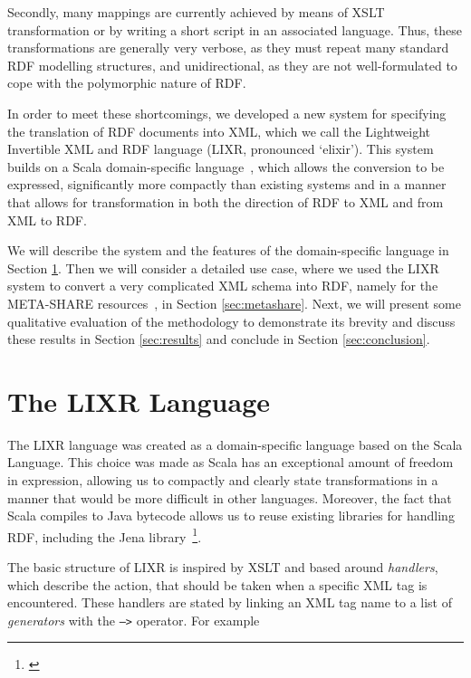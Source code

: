 \documentclass{acm_proc_article-sp}
\begin{document}
Secondly, many mappings are currently achieved by means of XSLT transformation or 
by writing a short script in an associated language. Thus, these transformations
are generally very verbose, as they must repeat many standard RDF modelling
structures, and unidirectional, as they are not well-formulated to cope with the 
polymorphic nature of RDF.

In order to meet these shortcomings, we developed a new system for specifying the
translation of RDF documents into XML, which we call the Lightweight Invertible
XML and RDF language (LIXR, pronounced `elixir'). This system builds on a 
Scala domain-specific language~\cite[DSL]{fowler2010domain,wampler2008programming}, which allows the conversion to be
expressed, significantly more compactly than existing systems and in a manner
that allows for transformation in both the direction of RDF to XML and from XML
to RDF.

We will describe the system and the features of the domain-specific language in Section
\ref{sec:dsl}. Then we will consider a detailed use case, where we used the LIXR
system to convert a very complicated XML schema into RDF, namely for the META-SHARE
resources~\cite{mccrae2015ontology,piperidis2012meta}, in Section \ref{sec:metashare}. Next, we will present some qualitative evaluation
of the methodology to demonstrate its brevity and discuss these results in Section
\ref{sec:results} and conclude in Section \ref{sec:conclusion}.

\section{The LIXR Language}
\label{sec:dsl}

The LIXR language was created as a domain-specific language based on the Scala
Language. This choice was made as Scala has an exceptional amount of freedom in
expression, allowing us to compactly and clearly state transformations in a manner
that would be more difficult in other languages. Moreover, the fact that Scala
compiles to Java bytecode allows us to reuse existing libraries for handling
RDF, including the Jena library~\footnote{\url{}}.

The basic structure of LIXR is inspired by XSLT and based around \emph{handlers},
which describe the action, that should be taken when a specific XML tag is 
encountered. These handlers are stated by linking an XML tag name to a list
of \emph{generators} with the {\tt -->} operator. For example
\end{document}
